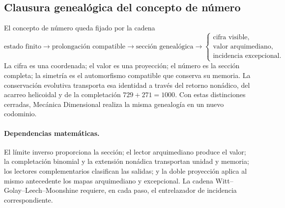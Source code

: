 \subsection{Clausura genealógica del concepto de número}

El concepto de número queda fijado por la cadena
\[
 \boxed{
 \text{estado finito}
 \longrightarrow\text{prolongación compatible}
 \longrightarrow\text{sección genealógica}
 \longrightarrow
 \begin{cases}
   \text{cifra visible},\\
   \text{valor arquimediano},\\
   \text{incidencia excepcional}.
 \end{cases}}
\]
La cifra es una coordenada; el valor es una proyección; el número es la
sección completa; la simetría es el automorfismo compatible que conserva su
memoria. La conservación evolutiva transporta esa identidad a través del
retorno nonádico, del acarreo helicoidal y de la completación
\(729+271=1000\). Con estas distinciones cerradas, Mecánica Dimensional
realiza la misma genealogía en un nuevo codominio.

\paragraph{Dependencias matemáticas.}
El límite inverso proporciona la sección; el lector arquimediano produce el
valor; la completación binomial y la extensión nonádica transportan unidad y
memoria; los lectores complementarios clasifican las salidas; y la doble
proyección aplica al mismo antecedente los mapas arquimediano y excepcional.
La cadena Witt--Golay--Leech--Moonshine requiere, en cada paso, el
entrelazador de incidencia correspondiente.
